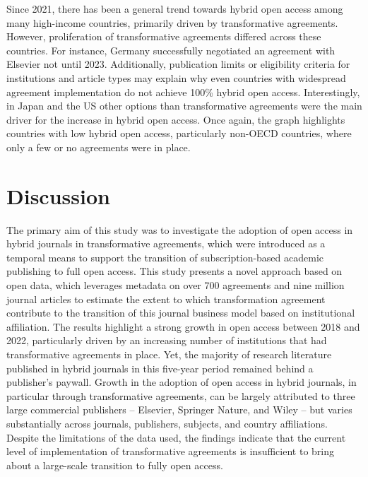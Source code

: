 \documentclass[a4paper,man,floatsintext,longtable,noextraspace,12pt]{apa6}
\begin{document}
Since 2021, there has been a general trend towards hybrid open access
among many high-income countries, primarily driven by transformative
agreements. However, proliferation of transformative agreements differed
across these countries. For instance, Germany successfully negotiated an
agreement with Elsevier not until 2023. Additionally, publication limits
or eligibility criteria for institutions and article types may explain
why even countries with widespread agreement implementation do not
achieve 100\% hybrid open access. Interestingly, in Japan and the US
other options than transformative agreements were the main driver for
the increase in hybrid open access. Once again, the graph highlights
countries with low hybrid open access, particularly non-OECD countries,
where only a few or no agreements were in place.

\hypertarget{discussion}{%
\section{Discussion}\label{discussion}}

The primary aim of this study was to investigate the adoption of open
access in hybrid journals in transformative agreements, which were
introduced as a temporal means to support the transition of
subscription-based academic publishing to full open access. This study
presents a novel approach based on open data, which leverages metadata
on over 700 agreements and nine million journal articles to estimate the
extent to which transformation agreement contribute to the transition of
this journal business model based on institutional affiliation. The
results highlight a strong growth in open access between 2018 and 2022,
particularly driven by an increasing number of institutions that had
transformative agreements in place. Yet, the majority of research
literature published in hybrid journals in this five-year period
remained behind a publisher's paywall. Growth in the adoption of open
access in hybrid journals, in particular through transformative
agreements, can be largely attributed to three large commercial
publishers -- Elsevier, Springer Nature, and Wiley -- but varies
substantially across journals, publishers, subjects, and country
affiliations. Despite the limitations of the data used, the findings
indicate that the current level of implementation of transformative
agreements is insufficient to bring about a large-scale transition to
fully open access.
\end{document}

